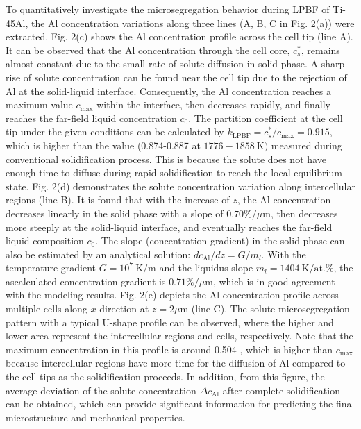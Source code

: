 \documentclass[10pt]{article}
\begin{document}
To quantitatively investigate the microsegregation behavior during LPBF of Ti-45Al, the Al concentration variations along three lines (A, B, $\mathrm{C}$ in Fig. 2(a)) were extracted. Fig. 2(c) shows the Al concentration profile across the cell tip (line A). It can be observed that the Al concentration through the cell core, $c_{s}^{*}$, remains almost constant due to the small rate of solute diffusion in solid phase. A sharp rise of solute concentration can be found near the cell tip due to the rejection of $\mathrm{Al}$ at the solid-liquid interface. Consequently, the Al concentration reaches a maximum value $c_{\max }$ within the interface, then decreases rapidly, and finally reaches the far-field liquid concentration $c_{0}$. The partition coefficient at the cell tip under the given conditions can be calculated by $k_{\mathrm{LPBF}}=c_{s}^{*} / c_{\max }=0.915$, which is higher than the value (0.874-0.887 at $1776-1858 \mathrm{~K})$ measured during conventional solidification process. This is because the solute does not have enough time to diffuse during rapid solidification to reach the local equilibrium state. Fig. 2(d) demonstrates the solute concentration variation along intercellular regions (line B). It is found that with the increase of $z$, the Al concentration decreases linearly in the solid phase with a slope of $0.70 \% / \mu \mathrm{m}$, then decreases more steeply at the solid-liquid interface, and eventually reaches the far-field liquid composition $c_{0}$. The slope (concentration gradient) in the solid phase can also be estimated by an analytical solution: $d c_{\mathrm{Al}} / d z=G / m_{l}$. With the temperature gradient $G=10^{7} \mathrm{~K} / \mathrm{m}$ and the liquidus slope $m_{l}=1404 \mathrm{~K} / \mathrm{at} . \%$, the ascalculated concentration gradient is $0.71 \% / \mu \mathrm{m}$, which is in good agreement with the modeling results. Fig. 2(e) depicts the $\mathrm{Al}$ concentration profile across multiple cells along $x$ direction at $z=2 \mu \mathrm{m}$ (line C). The solute microsegregation pattern with a typical U-shape profile can be observed, where the higher and lower area represent the intercellular regions and cells, respectively. Note that the maximum concentration in this profile is around 0.504 , which is higher than $c_{\max }$ because intercellular regions have more time for the diffusion of Al compared to the cell tips as the solidification proceeds. In addition, from this figure, the average deviation of the solute concentration $\Delta c_{\mathrm{Al}}$ after complete solidification can be obtained, which can provide significant information for predicting the final microstructure and mechanical properties.
\end{document}

